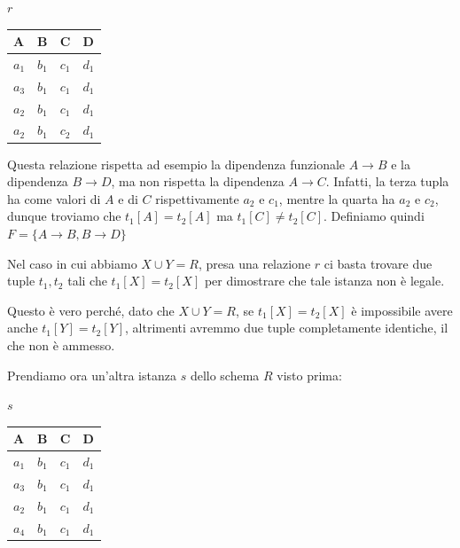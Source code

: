 \documentclass[11pt, a4paper, titlepage, oneside]{scrbook}
\begin{document}
\begin{center}
$r$ \nopagebreak

\begin{tabular}{|l|l|l|l|}
\hline
\textbf{A} & \textbf{B} & \textbf{C} & \textbf{D}\\ \hline
$a_1$ & $b_1$ & $c_1$ & $d_1$ \\
$a_3$ & $b_1$ & $c_1$ & $d_1$ \\
$a_2$ & $b_1$ & $c_1$ & $d_1$ \\
$a_2$ & $b_1$ & $c_2$ & $d_1$ \\ \hline
\end{tabular}
\end{center}

Questa relazione rispetta ad esempio la dipendenza funzionale $A \longrightarrow B$ e la dipendenza $B \longrightarrow D$, ma non rispetta la dipendenza $A \longrightarrow C$. Infatti, la terza tupla ha come valori di $A$ e di $C$ rispettivamente $a_2$ e $c_1$, mentre la quarta ha $a_2 $ e $c_2$, dunque troviamo che $t_1[A] = t_2[A]$ ma $t_1[C] \neq t_2[C]$. Definiamo quindi $F = \{A \longrightarrow B, B \longrightarrow D\}$

\begin{Osservazione}[]
\label{oss-soddisfare-dipendenza-2}
Nel caso in cui abbiamo $X \cup Y = R$, presa una relazione $r$ ci basta trovare due tuple $t_1,t_2$ tali che $t_1[X] = t_2[X]$ per dimostrare che tale istanza non è legale.  
\end{Osservazione}

Questo è vero perché, dato che $X \cup Y = R$, se $t_1[X] = t_2[X]$ è impossibile avere anche $t_1[Y] = t_2[Y]$, altrimenti avremmo due tuple completamente identiche, il che non è ammesso.

Prendiamo ora un'altra istanza $s$ dello schema $R$ visto prima:

\begin{center}
$s$ \nopagebreak

\begin{tabular}{|l|l|l|l|}
\hline
\textbf{A} & \textbf{B} & \textbf{C} & \textbf{D}\\ \hline
$a_1$ & $b_1$ & $c_1$ & $d_1$ \\
$a_3$ & $b_1$ & $c_1$ & $d_1$ \\
$a_2$ & $b_1$ & $c_1$ & $d_1$ \\
$a_4$ & $b_1$ & $c_1$ & $d_1$ \\ \hline
\end{tabular}
\end{center}
\end{document}
